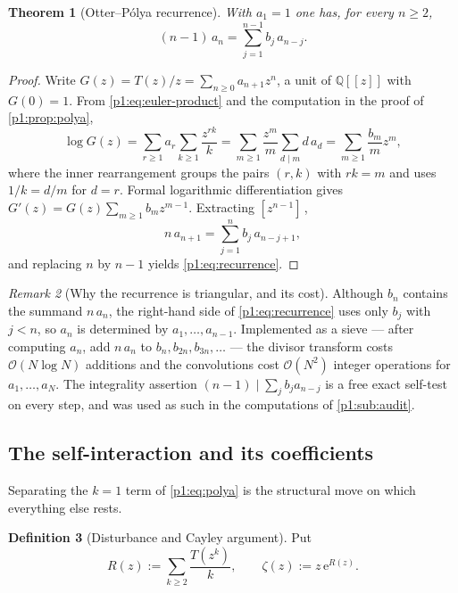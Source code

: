 \documentclass[11pt,a4paper,oneside]{book}
\theoremstyle{plain}
\newtheorem{theorem}{Theorem}[chapter]
\theoremstyle{definition}
\newtheorem{definition}[theorem]{Definition}
\theoremstyle{remark}
\newtheorem{remark}[theorem]{Remark}
\newcommand{\Rat}{\mathbb{Q}}
\newcommand{\e}{\mathrm{e}}
\newcommand{\Coef}[1]{[#1]\,}
\newcommand{\bigO}{\mathcal{O}}
\begin{document}
\begin{theorem}[Otter--P\'olya recurrence]
\label{p1:thm:recurrence}
With $a_1=1$ one has, for every $n\ge2$,
\begin{equation}
 (n-1)\,a_n=\sum_{j=1}^{n-1}b_j\,a_{n-j}.
 \label{p1:eq:recurrence}
\end{equation}
\end{theorem}

\begin{proof}
Write $G(z)=T(z)/z=\sum_{n\ge0}a_{n+1}z^n$, a unit of $\Rat[[z]]$ with $G(0)=1$. From
\cref{p1:eq:euler-product} and the computation in the proof of \cref{p1:prop:polya},
\[
\log G(z)=\sum_{r\ge1}a_r\sum_{k\ge1}\frac{z^{rk}}{k} =\sum_{m\ge1}\frac{z^m}{m}\sum_{d\mid
m}d\,a_d =\sum_{m\ge1}\frac{b_m}{m}z^m,
\]
where the inner rearrangement groups the pairs $(r,k)$ with $rk=m$ and uses $1/k=d/m$ for
$d=r$.  Formal logarithmic differentiation gives $G'(z)=G(z)\sum_{m\ge1}b_mz^{m-1}$.
Extracting $\Coef{z^{n-1}}$,
\[
n\,a_{n+1}=\sum_{j=1}^{n}b_j\,a_{n-j+1},
\]
and replacing $n$ by $n-1$ yields \cref{p1:eq:recurrence}.
\end{proof}

\begin{remark}[Why the recurrence is triangular, and its cost]
\label{p1:rem:triangular}
Although $b_n$ contains the summand $n\,a_n$, the right-hand side of \cref{p1:eq:recurrence}
uses only $b_j$ with $j<n$, so $a_n$ is determined by $a_1,\ldots,a_{n-1}$.  Implemented as a
sieve --- after computing $a_n$, add $n\,a_n$ to $b_n,b_{2n},b_{3n},\ldots$ --- the divisor
transform costs $\bigO(N\log N)$ additions and the convolutions cost $\bigO(N^2)$ integer
operations for $a_1,\ldots,a_N$.  The integrality assertion $(n-1)\mid\sum_jb_ja_{n-j}$ is a
free exact self-test on every step, and was used as such in the computations of
\cref{p1:sub:audit}.
\end{remark}

\subsection{The self-interaction and its coefficients}

Separating the $k=1$ term of \cref{p1:eq:polya} is the structural move on which everything
else rests.

\begin{definition}[Disturbance and Cayley argument]
\label{p1:def:R-zeta}
Put
\begin{equation}
 R(z):=\sum_{k\ge2}\frac{T(z^k)}{k},
 \qquad
 \zeta(z):=z\,\e^{R(z)} .
 \label{p1:eq:R-zeta}
\end{equation}
\end{definition}
\end{document}

